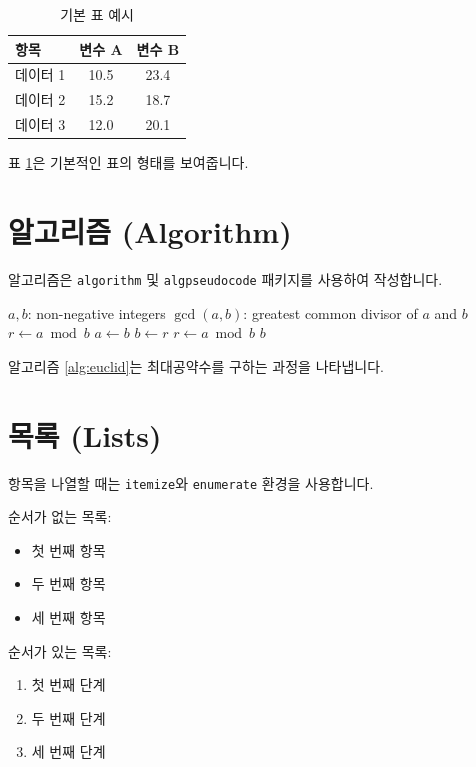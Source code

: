 \documentclass[master, korean]{pnuthesis}
\begin{document}
\begin{table}[htbp]
    \centering
    \caption{기본 표 예시}
    \label{tab:sample_table}
    \begin{tabular}{lcc}
        \toprule
        \textbf{항목} & \textbf{변수 A} & \textbf{변수 B} \\
        \midrule
        데이터 1 & 10.5 & 23.4 \\
        데이터 2 & 15.2 & 18.7 \\
        데이터 3 & 12.0 & 20.1 \\
        \bottomrule
    \end{tabular}
\end{table}

표 \ref{tab:sample_table}은 기본적인 표의 형태를 보여줍니다.

\section{알고리즘 (Algorithm)}
알고리즘은 \texttt{algorithm} 및 \texttt{algpseudocode} 패키지를 사용하여 작성합니다.

\begin{algorithm}
    \caption{유클리드 호제법 (Euclidean Algorithm)}
    \label{alg:euclid}
    \begin{algorithmic}[1]
        \Require $a, b$: non-negative integers
        \Ensure $\gcd(a, b)$: greatest common divisor of $a$ and $b$
        \State $r \gets a \bmod b$
            \State $a \gets b$
            \State $b \gets r$
            \State $r \gets a \bmod b$
        \EndWhile
        \State \Return $b$
    \end{algorithmic}
\end{algorithm}

알고리즘 \ref{alg:euclid}는 최대공약수를 구하는 과정을 나타냅니다.

\section{목록 (Lists)}
항목을 나열할 때는 \texttt{itemize}와 \texttt{enumerate} 환경을 사용합니다.

순서가 없는 목록:
\begin{itemize}
    \item 첫 번째 항목
    \item 두 번째 항목
    \item 세 번째 항목
\end{itemize}

순서가 있는 목록:
\begin{enumerate}
    \item 첫 번째 단계
    \item 두 번째 단계
    \item 세 번째 단계
\end{enumerate}
\end{document}
